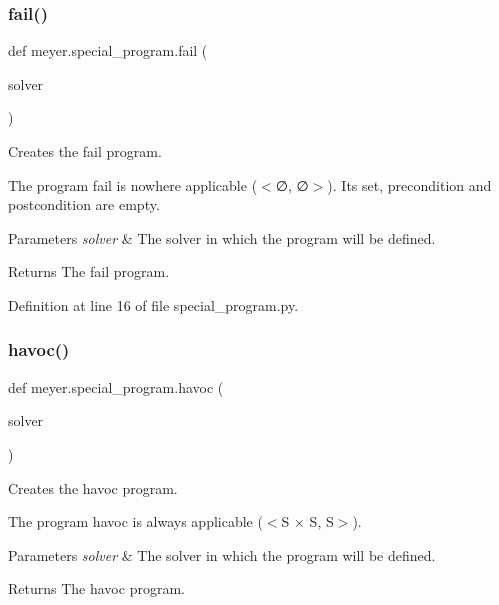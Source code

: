 \subsubsection{\texorpdfstring{fail()}{fail()}}
{\footnotesize\ttfamily def meyer.\+special\+\_\+program.\+fail (\begin{DoxyParamCaption}\item[{}]{solver }\end{DoxyParamCaption})}



Creates the fail program. 

The program fail is nowhere applicable ($<$∅, ∅$>$). Its set, precondition and postcondition are empty. 
\begin{DoxyParams}{Parameters}
{\em solver} & The solver in which the program will be defined. \\
\hline
\end{DoxyParams}
\begin{DoxyReturn}{Returns}
The fail program. 
\end{DoxyReturn}


Definition at line 16 of file special\+\_\+program.\+py.

\mbox{\label{namespacemeyer_1_1special__program_a82762750ef41bb2f8580570bb8905df5}} 
\subsubsection{\texorpdfstring{havoc()}{havoc()}}
{\footnotesize\ttfamily def meyer.\+special\+\_\+program.\+havoc (\begin{DoxyParamCaption}\item[{}]{solver }\end{DoxyParamCaption})}



Creates the havoc program. 

The program havoc is always applicable ($<$S × S, S$>$). 
\begin{DoxyParams}{Parameters}
{\em solver} & The solver in which the program will be defined. \\
\hline
\end{DoxyParams}
\begin{DoxyReturn}{Returns}
The havoc program. 
\end{DoxyReturn}


